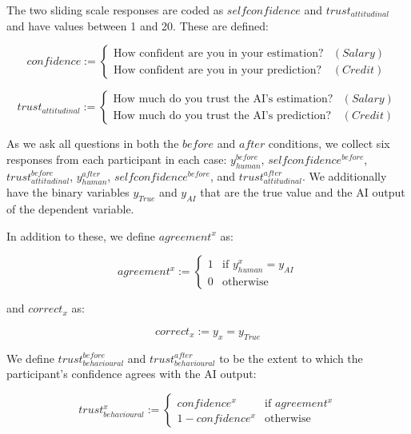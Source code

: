\noindent The two sliding scale responses are coded as $selfconfidence$ and $trust_{attitudinal}$ and have values between 1 and 20. These are defined:

\begin{equation}
    confidence := \begin{cases}
        \text{How confident are you in your estimation?} & (Salary) \\
        \text{How confident are you in your prediction?} & (Credit)
    \end{cases}
\end{equation}

\begin{equation}
    trust_{attitudinal} := \begin{cases}
        \text{How much do you trust the AI's estimation?} & (Salary) \\
        \text{How much do you trust the AI's prediction?} & (Credit)
    \end{cases}
\end{equation}

As we ask all questions in both the $before$ and $after$ conditions, we collect six responses from each participant in each case: $y_{human}^{before}$, $selfconfidence^{before}$, $trust_{attitudinal}^{before}$, $y_{human}^{after}$, $selfconfidence^{before}$, and $trust_{attitudinal}^{after}$.  We additionally have the binary variables $y_{True}$ and $y_{AI}$ that are the true value and the AI output of the dependent variable.

In addition to these, we define $agreement^{x}$ as:

\begin{equation}
    agreement^{x} := \begin{cases}
        1 & \text{if } y_{human}^{x} = y_{AI} \\
        0 & \text{otherwise}
    \end{cases}
\end{equation}

\noindent and $correct_{x}$ as:

\begin{equation}
    correct_{x} := y_{x} = y_{True}
\end{equation}

We define $trust_{behavioural}^{before}$ and $trust_{behavioural}^{after}$ to be the extent to which the participant's confidence agrees with the AI output:

\begin{equation}
    trust_{behavioural}^{x} := \begin{cases}
        confidence^{x}      & \text{if } agreement^{x} \\
        1-confidence^{x}    & \text{otherwise}
    \end{cases}
\end{equation}

